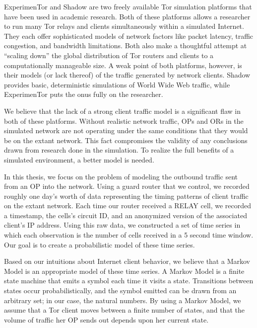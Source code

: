 ExperimenTor \citep{exptorwpaper} and Shadow \citep{shadowwpaper} are two  freely available Tor simulation platforms that have been used in academic research. Both of these platforms allows a researcher to run many Tor relays and clients simultaneously within a simulated Internet. They each offer sophisticated models of network factors like packet latency, traffic congestion, and bandwidth limitations. Both also make a thoughtful attempt at ``scaling down'' the global distribution of Tor routers and clients to a computationally manageable size. A weak point of both platforms, however, is their models (or lack thereof) of the traffic generated by network clients. Shadow provides basic, deterministic simulations of World Wide Web traffic, while ExperimenTor puts the onus fully on the researcher.

We believe that the lack of a strong client traffic model is a significant flaw in both of these platforms. Without realistic network traffic, OPs and ORs in the simulated network are not operating under the same conditions that they would be on the extant network. This fact compromises the validity of any conclusions drawn from research done in the simulation. To realize the full benefits of a simulated environment, a better model is needed.

In this thesis, we focus on the problem of modeling the outbound traffic sent from an OP into the network. Using a guard router that we control, we
recorded roughly one day's worth of data representing the timing patterns of client traffic on the extant network. Each time our router received a RELAY cell, we recorded a timestamp, the cells's circuit ID, and an anonymized version of the associated client's IP address. Using this raw data, we constructed a set of time series in which each observation is the number of cells received in a 5 second time window. Our goal is to create a probabilistic model of these time series.

Based on our intuitions about Internet client behavior, we believe that a Markov Model is an appropriate model of these time series. A Markov Model is a finite state machine that emits a symbol each time it visits a state. Transitions between states occur probabilistically, and the symbol emitted can be drawn from an arbitrary set; in our case, the natural numbers. By using a Markov Model, we assume that a Tor client moves between a finite number of states, and that the volume of traffic her OP sends out depends upon her current state.




